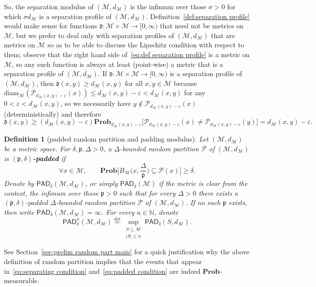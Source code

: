 \documentclass[11pt,reqno]{amsart}
\renewcommand{\le}{\leqslant}
\renewcommand{\ge}{\geqslant}
\newcommand{\diam}{\mathrm{diam}}
\renewcommand{\d}{\delta}
\newcommand{\e}{\varepsilon}
\newtheorem{definition}[theorem]{Definition}
\theoremstyle{remark}
\newcommand{\MM}{\mathcal{M}}
\renewcommand{\subset}{\subseteq}
\newcommand{\N}{\mathbb N}
\newcommand{\eqdef}{\stackrel{\mathrm{def}}{=}}
\renewcommand{\Pr}{\mathbf{Prob}}
\renewcommand{\1}{\mathbf 1}
\newcommand{\Part}{\mathscr{P}}
\newcommand{\pad}{\mathsf{PAD}}
\begin{document}
So, the separation modulus of $(\MM,d_\MM)$ is the infimum over those $\sigma>0$ for which $\sigma d_\MM$ is a separation profile of $(\MM,d_\MM)$. Definition~\ref{def:separation profile} would make sense for functions $\mathfrak{d}:\MM\times \MM\to [0,\infty)$  that need not be metrics on $\MM$, but we prefer to deal only with separation profiles of $(\MM,d_\MM)$  that are metrics on $\MM$ so as to be able to discuss the Lipschitz condition with respect to them; observe that the right hand side of~\eqref{eq:def separation profile} is a metric on $\MM$, so any such function is always at least (point-wise) a metric that is a separation profile of $(\MM,d_\MM)$. If $\mathfrak{d}:\MM\times \MM\to [0,\infty)$ is a separation profile of $(\MM,d_\MM)$, then $\mathfrak{d}(x,y)\ge d_\MM(x,y)$ for all $x,y\in \MM$ because $\diam_\MM(\Part_{d_\MM(x,y)-\e}(x))\le d_\MM(x,y)-\e<d_\MM(x,y)$ for any $0<\e<d_\MM(x,y)$, so we necessarily have  $y\notin \Part_{d_\MM(x,y)-\e}(x)$ (deterministically) and therefore \begin{equation}\label{eq:frak d lower}
\mathfrak{d}(x,y)\ge (d_\MM(x,y)-\e)\Pr_{d_\MM(x,y)-\e}\big[\Part_{d_\MM(x,y)-\e}(x)\neq \Part_{d_\MM(x,y)-\e}(y)\big]=d_\MM(x,y)-\e.
\end{equation}





\begin{definition}[padded random partition and padding modulus]\label{def:padded finite} Let $(\MM,d_\MM)$ be a  metric space. For $\d,{\mathfrak{p}},\Delta>0$, a $\Delta$-bounded random  partition $\Part$ of $(\MM,d_\MM)$ is {\bf \em $({\mathfrak{p}},\d)$-padded} if
\begin{equation}\label{eq:padded condition}
\forall  x\in \MM,\qquad \Pr\Big[B_\MM\Big(x,\frac{\Delta}{{\mathfrak{p}}}\Big)\subset \Part(x)\Big]\ge \d.
\end{equation}
Denote by $\pad_\d(\MM,d_\MM)$, or simply $\pad_\d(\MM)$ if the metric is clear from the context, the infimum over those $\mathfrak{p}>0$ such that for every $\Delta>0$ there exists  a $({\mathfrak{p}},\d)$-padded $\Delta$-bounded random partition $\Part$ of $(\MM,d_\MM)$. If no such $\mathfrak{p}$ exists, then write $\pad_\d(\MM,d_\MM)=\infty$. For every $n\in \N$, denote
$$
\pad^n_\d(\MM,d_\MM)\eqdef \sup_{\substack{S\subset \MM\\ |S|\le n}}\pad_\d(S,d_\MM).
$$
\end{definition}

See Section~\ref{sec:prelim random part main} for a quick justification why the above definition of random partition implies that the events that appear in~\eqref{eq:separating condition} and~\eqref{eq:padded condition} are indeed $\Pr$-measurable.
\end{document}
